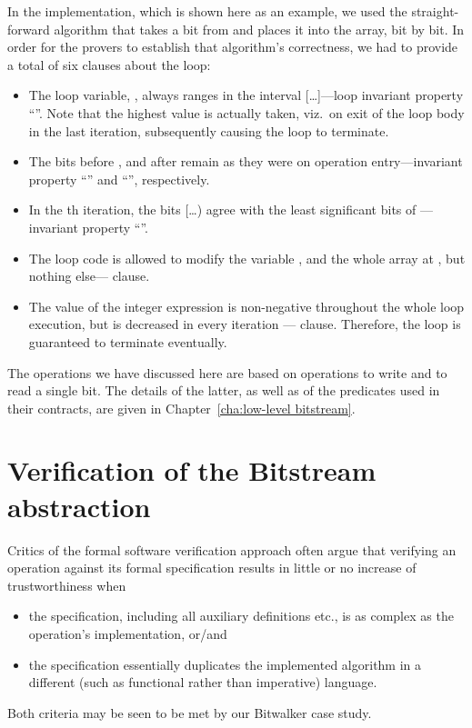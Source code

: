 In the implementation, which is shown here as an example, we used
the straight-forward
algorithm that takes a bit from  and places it into
the  array, bit by bit.
%
In order for the provers to establish that algorithm's correctness,
we had to provide a total of six \acsl clauses about the loop:
%
\begin{itemize}
\item The loop variable, , always ranges in the interval
	[\ldots{}]---loop invariant property ``''.
	Note that the highest value is actually taken,
	viz.\ on exit of the loop body in the last iteration,
	subsequently causing the loop to terminate.
\item The bits before , and after
	remain as they were on operation entry---invariant property
	``'' and ``'', respectively.
\item In the th iteration, the bits
	[\ldots{}) agree with
	the least significant
	 bits of ---invariant property
	``''.
\item The loop code is allowed to modify the variable ,
	and the whole array
	at , but nothing else---
	 clause.
\item The value of the integer
	expression  is non-negative throughout
	the whole loop execution, but is decreased in every iteration 
	---  clause.
	Therefore, the loop is guaranteed to terminate eventually.
\end{itemize}




The operations we have discussed here are based
on operations to write and to read a single bit.
%
The details of the latter, as well as of the predicates used in their
contracts, are given in Chapter~\ref{cha:low-level bitstream}.

\clearpage


\section{Verification of the Bitstream abstraction}
\label{sec:bitstream verif}



Critics of the formal software verification approach often 
argue that verifying an operation against its formal specification
results in little or no increase of trustworthiness when
%
\begin{itemize}
\item the specification, including all auxiliary definitions etc., is
	as complex as the operation's implementation, or/and
\item the specification essentially duplicates the implemented
	algorithm in a different (such as functional rather than
	imperative) language.
\end{itemize}
%
Both criteria may be seen to be met by our Bitwalker case study.



